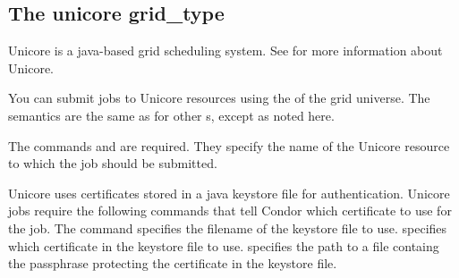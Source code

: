 
\subsection{\label{sec:Unicore}The unicore grid\_type }

Unicore is a java-based grid scheduling system. See
 for more information about Unicore.

You can submit jobs to Unicore resources using the 
 of the grid universe. The semantics are the same as
for other s, except as noted here.

The commands  and 
are required. They specify the name of the Unicore resource to which the
job should be submitted.

Unicore uses certificates stored in a java keystore file for
authentication. Unicore jobs require the following commands that tell
Condor which certificate to use for the job. The command
 specifies the filename of the keystore file to 
use.  specifies which certificate in the
keystore file to use.  specifies the
path to a file containg the passphrase protecting the certificate in the  
keystore file.
